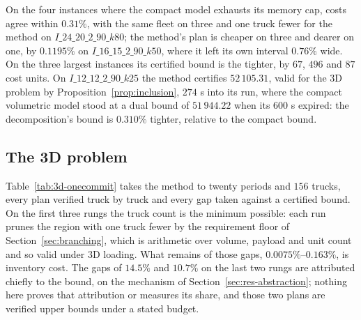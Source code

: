 On the four instances where the compact model exhausts its memory cap,
costs agree within $0.31\%$, with the same fleet on three and one truck
fewer for the method on $I\_24\_20\_2\_90\_k80$; the method's plan is
cheaper on three and dearer on one, by $0.1195\%$ on
$I\_16\_15\_2\_90\_k50$, where it left its own interval $0.76\%$ wide.
On the three largest instances its certified bound is the tighter, by
$67$, $496$ and $87$ cost units. On $I\_12\_12\_2\_90\_k25$ the method
certifies $52\,105.31$, valid for the 3D problem by
Proposition~\ref{prop:inclusion}, $274$ s into its run, where the
compact volumetric model stood at a dual bound of $51\,944.22$ when its
$600$ s expired: the decomposition's bound is $0.310\%$ tighter,
relative to the compact bound.

\subsection{The 3D problem}
\label{sec:res-3d}



Table~\ref{tab:3d-onecommit} takes the method to twenty periods and
$156$ trucks, every plan verified truck by truck and every gap taken
against a certified bound. On the first three rungs the truck count is
the minimum possible: each run prunes the region with one truck fewer
by the requirement floor of Section~\ref{sec:branching}, which is
arithmetic over volume, payload and unit count and so valid under 3D
loading. What remains of those gaps, $0.0075\%$--$0.163\%$, is
inventory cost. The gaps of $14.5\%$ and $10.7\%$ on the last two rungs
are attributed chiefly to the bound, on the mechanism of
Section~\ref{sec:res-abstraction}; nothing here proves that
attribution or measures its share, and those two plans are verified
upper bounds under a stated budget.

